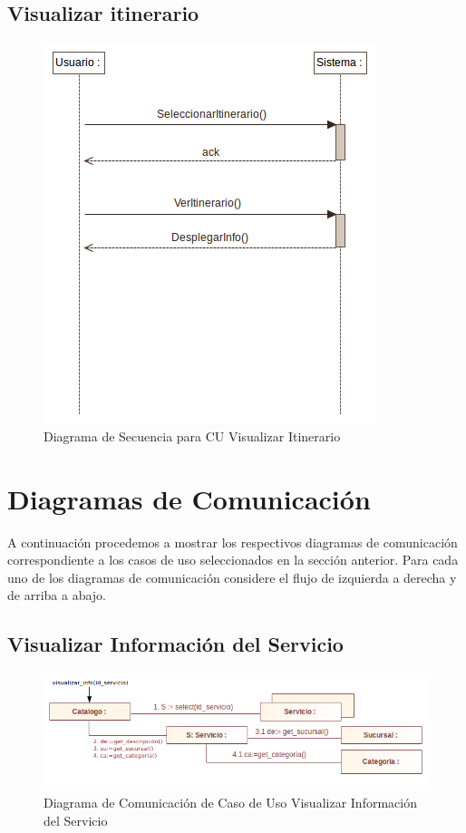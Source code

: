 \documentclass[12pt]{article}
\begin{document}
\subsection{Visualizar itinerario}
\begin{figure}[htp]
\centering
\includegraphics[scale=0.60]{Diagramas/Secuencia/visualizar_itinerario.png}
\caption{Diagrama de Secuencia para CU Visualizar Itinerario}
\label{}
\end{figure}
%
%
\section{Diagramas de Comunicación}
A continuación procedemos a mostrar los respectivos diagramas de comunicación correspondiente a los casos de uso seleccionados en la sección anterior. Para cada uno de los diagramas de comunicación considere el flujo de izquierda a derecha y de arriba a abajo.
\subsection{Visualizar Información del Servicio}
\begin{figure}[htp]
\centering
\includegraphics[scale=0.60]{Diagramas/Comunicacion/visualizar_info_servicio.png}
\caption{Diagrama de Comunicación de Caso de Uso Visualizar Información del Servicio }
\label{}
\end{figure}
\newpage
\end{document}
